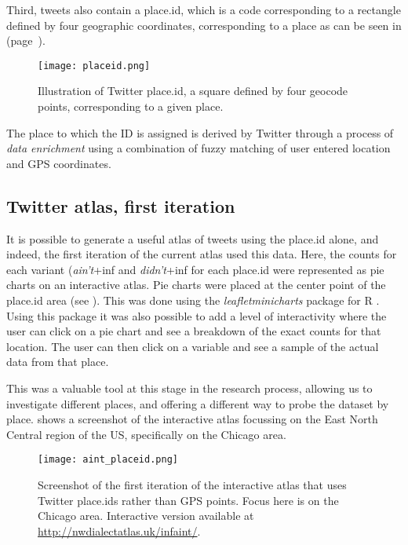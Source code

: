 \documentclass[output=paper,colorlinks,citecolor=brown,draftmode]{langscibook}
\begin{document}
Third, tweets also contain a place.id, which is a code corresponding to a rectangle defined by four geographic coordinates, corresponding to a place as can be seen in  (page~\pageref{fig:placeid}).

\begin{figure}
    \texttt{[image: placeid.png]}
    \caption{Illustration of Twitter place.id, a square defined by four geocode points, corresponding to a given place.}
    \label{fig:placeid}
\end{figure}

The place to which the ID is assigned is derived by Twitter through a process of \textit{data enrichment} using a combination of fuzzy matching of user entered location and GPS coordinates.

\subsection{Twitter atlas, first iteration}
\largerpage
It is possible to generate a useful atlas of tweets using the place.id alone, and indeed, the first iteration of the current atlas used this data. Here, the counts for each variant (\textit{ain't}+inf and \textit{didn't}+inf for each place.id were represented as pie charts on an interactive atlas. Pie charts were placed at the center point of the place.id area (see ). This was done using the \textit{leafletminicharts} package for R \citep{bachelier2021}. Using this package it was also possible to add a level of interactivity where the user can click on a pie chart and see a breakdown of the exact counts for that location. The user can then click on a variable and see a sample of the actual data from that place.

This was a valuable tool at this stage in the research process, allowing us to investigate different places, and offering a different way to probe the dataset by place.  shows a screenshot of the interactive atlas focussing on the East North Central region of the US, specifically on the Chicago area.\largerpage

\begin{figure}
    \texttt{[image: aint\_placeid.png]}
    \caption{Screenshot of the first iteration of the interactive atlas that uses Twitter place.ids rather than GPS points. Focus here is on the Chicago area. Interactive version available at \url{http://nwdialectatlas.uk/infaint/}.}
    \label{fig:aint_placeid}
\end{figure}
\end{document}
